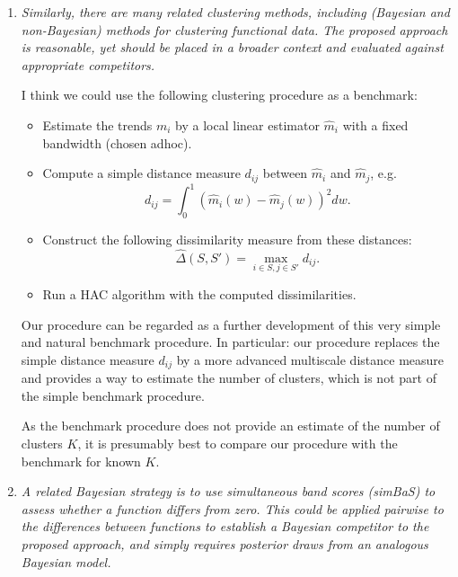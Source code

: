 \documentclass[a4paper,12pt]{article}
\begin{document}
\begin{enumerate}[label=\arabic*.,leftmargin=0.6cm]
{\begin{itemize}[topsep=0pt]
  
\end{itemize}
}



\item \textit{Similarly, there are many related clustering methods, including (Bayesian and non-Bayesian) methods for clustering functional data. The proposed approach is reasonable, yet should be placed in a broader context and evaluated against appropriate competitors.}

{\color{blue}  
I think we could use the following clustering procedure as a benchmark:
\begin{itemize}[label=--,leftmargin=0.45cm,itemsep=0pt,topsep=0pt]
\item Estimate the trends $m_i$ by a local linear estimator $\hat{m}_i$ with a fixed bandwidth (chosen adhoc).
\item Compute a simple distance measure $d_{ij}$ between $\hat{m}_i$ and $\hat{m}_j$, e.g.
\[ d_{ij} = \int_0^1 (\hat{m}_i(w) - \hat{m}_j(w))^2 dw. \]
\item Construct the following dissimilarity measure from these distances:
\[ \hat{\Delta}(S,S') = \max_{i \in S,j \in S'} d_{ij}. \]
\item Run a HAC algorithm with the computed dissimilarities. 
\end{itemize}

Our procedure can be regarded as a further development of this very simple and natural benchmark procedure. In particular: our procedure replaces the simple distance measure $d_{ij}$ by a more advanced multiscale distance measure and provides a way to estimate the number of clusters, which is not part of the simple benchmark procedure.

As the benchmark procedure does not provide an estimate of the number of clusters $K$, it is presumably best to compare our procedure with the benchmark for known $K$. 

}
  

\item \textit{A related Bayesian strategy is to use simultaneous band scores (simBaS) to assess whether a function differs from zero. This could be applied pairwise to the differences between functions to establish a Bayesian competitor to the proposed approach, and simply requires posterior draws from an analogous Bayesian model.}


\end{enumerate}
\end{document}
